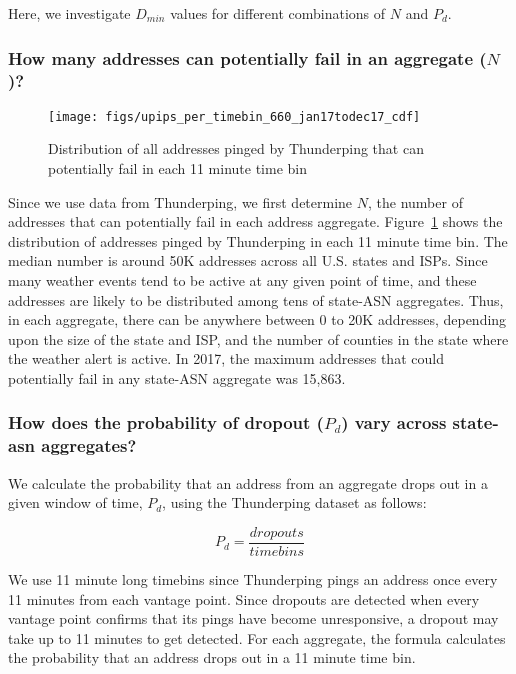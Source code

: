 Here, we investigate $D_{min}$ values for different combinations of
$N$ and $P_d$.

\subsubsection*{How many addresses can potentially fail in an
  aggregate ($N$)?}

\begin{figure}[t]
\centering
\texttt{[image: figs/upips\_per\_timebin\_660\_jan17todec17\_cdf]}
\caption{
\label{fig:upips_per_timebin}
Distribution of all addresses pinged by Thunderping that can potentially fail in each 11 minute
time bin}
\end{figure}

Since we use data from Thunderping, we first determine $N$, the number
of addresses that can potentially fail in each address
aggregate. Figure~\ref{fig:upips_per_timebin} shows the distribution
of addresses pinged by Thunderping in each 11 minute time bin. The
median number is around 50K addresses across all U.S. states and
ISPs. Since many weather events tend to be active at any given point of time, and
these addresses are likely to be distributed among tens of state-ASN
aggregates. Thus, in each aggregate, there can be anywhere between 0
to 20K addresses, depending upon the size of the state and ISP, and
the number of counties in the state where the weather alert is
active. In 2017, the maximum addresses that could potentially fail in
any state-ASN aggregate was 15,863.

\subsubsection*{How does the probability of dropout ($P_d$) vary across
  state-asn aggregates?}

We calculate the probability that an address from an aggregate drops
out in a given window of time, $P_d$, using the Thunderping
dataset as follows:

\begin{equation}
P_d= \frac{dropouts}{timebins}
\label{eq:p_dropout}
\end{equation}

We use 11 minute long timebins since Thunderping pings an address
once every 11 minutes from each vantage point. Since dropouts are
detected when every vantage point confirms that its pings have become
unresponsive, a dropout may take up to 11 minutes to get detected. For
each aggregate, the formula calculates the probability that an address
drops out in a 11 minute time bin.

